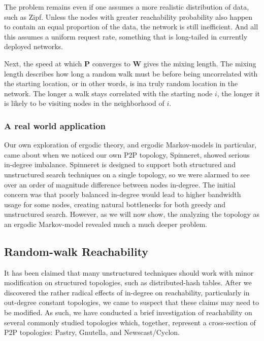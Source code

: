 \documentclass[a4paper,11pt,twocolumn]{article}
\begin{document}
The problem remains even if one assumes a more realistic distribution of data,
such as Zipf.  Unless the nodes with greater reachability probability also
happen to contain an equal proportion of the data, the network is still
inefficient.  And all this assumes a uniform request rate, something that
is long-tailed in currently deployed networks.

Next, the speed at which $\textbf{P}$ converges to $\textbf{W}$ gives the
mixing length.  The mixing length describes how long a random walk must be
before being uncorrelated with the starting location, or in other words, is ina
truly random location in the network.  The longer a walk stays correlated with
the starting node $i$, the longer it is likely to be visiting nodes in the
neighborhood of $i$.



\subsubsection{A real world application}

Our own exploration of ergodic theory, and ergodic Markov-models in particular,
came about when we noticed our own P2P topology, Spinneret, showed serious
in-degree imbalance.  Spinneret is designed to support both structured and
unstructured search techniques on a single topology, so we were alarmed to see
over an order of magnitude difference between nodes in-degree.  The initial
concern was that poorly balanced in-degree would lead to higher bandwidth usage
for some nodes, creating natural bottlenecks for both greedy and unstructured
search.  However, as we will now show, the analyzing the topology as an ergodic
Markov-model revealed much a much deeper problem.


\subsection{Random-walk Reachability}

It has been claimed that many unstructured techniques should work with minor
modification on structured topologies, such as distributed-hash tables.  After
we discovered the rather radical effects of in-degree on reachability,
particularly in out-degree constant topologies, we came to suspect that these
claims may need to be modified.  As such, we have conducted a brief
investigation of reachability on several commonly studied topologies which,
together, represent a cross-section of P2P topologies: Pastry, Gnutella, and
Newscast/Cyclon.
\end{document}
